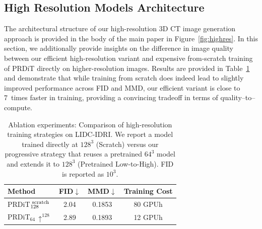 \subsection{High Resolution Models Architecture}
The architectural structure of our high-resolution 3D CT image generation approach is provided in the body of the main paper in Figure~\ref{fig:highres}. In this section, we additionally provide insights on the difference in image quality between our efficient high-resolution variant and expensive from-scratch training of PRDiT directly on higher-resolution images. Results are provided in Table~\ref{tab:ablation-highres64} and demonstrate that while training from scratch does indeed lead to slightly improved performance across FID and MMD, our efficient variant is close to 7~times faster in training, providing a convincing tradeoff in terms of quality--to--compute.
\begin{table}[h!]
\caption{Ablation experiments: Comparison of high-resolution training strategies on LIDC-IDRI. We report a model trained directly at $128^3$ (Scratch) versus our progressive strategy that reuses a pretrained $64^3$ model and extends it to $128^3$ (Pretrained Low-to-High). FID is reported as $10^3$.}
\vspace{-6pt}
\centering
\small
\begin{tabular}{lccc}
\toprule
Method & FID$\downarrow$ & MMD$\downarrow$ & Training Cost \\
\midrule
PRDiT$_{128}^{\text{\;scratch}}$ & 2.04 & 0.1853 & 80 GPUh \vspace{2pt}\\
PRDiT$_{64}$\,$\uparrow^{128}$ & 2.89 & 0.1893 & 12 GPUh \\
\bottomrule
\end{tabular}
\label{tab:ablation-highres64}
\end{table}


